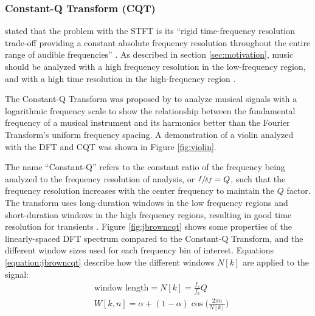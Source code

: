 \documentclass[report.tex]{subfiles}
\begin{document}
\newpagefill

\subsubsection{Constant-Q Transform (CQT)}
\label{sec:cqt}

\citeauthor{cqtransient} stated that the problem with the STFT is its ``rigid time-frequency resolution trade-off providing a constant absolute frequency resolution throughout the entire range of audible frequencies'' \parencite[1]{cqtransient}. As described in section \ref{sec:motivation}, music should be analyzed with a high frequency resolution in the low-frequency region, and with a high time resolution in the high-frequency region \parencite{doerflerphd, cqtransient}. 

The Constant-Q Transform was proposed by \textcite{jbrown, msp} to analyze musical signals with a logarithmic frequency scale to show the relationship between the fundamental frequency of a musical instrument and its harmonics better than the Fourier Transform's uniform frequency spacing. A demonstration of a violin analyzed with the DFT and CQT was shown in Figure \ref{fig:violin}.

The name ``Constant-Q'' refers to the constant ratio of the frequency being analyzed to the frequency resolution of analysis, or $\sfrac{f}{\delta f} = Q$, such that the frequency resolution increases with the center frequency to maintain the $Q$ factor. The transform uses long-duration windows in the low frequency regions and short-duration windows in the high frequency regions, resulting in good time resolution for transients \parencite{cqtransient}. Figure \ref{fig:jbrowncqt} shows some properties of the linearly-spaced DFT spectrum compared to the Constant-Q Transform, and the different window sizes used for each frequency bin of interest. Equations \eqref{equation:jbrowncqt} describe how the different windows $N[k]$ are applied to the signal:
\begin{align}\tag{9}\label{equation:jbrowncqt}
	\nonumber & \text{window length} = N[k] = \frac{f_{s}}{f_{k}}Q\\
	\nonumber & W[k, n] = \alpha + (1 - \alpha)\cos\big(\frac{2\pi n}{N[k]}\big)
\end{align}
\end{document}
